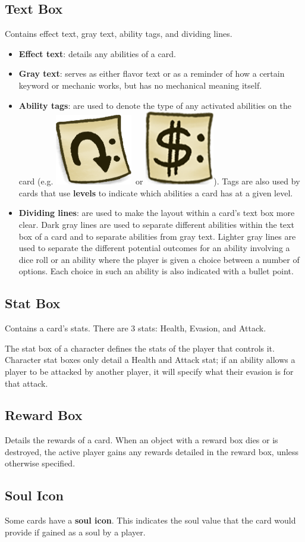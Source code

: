 \documentclass[a4paper, twoside]{report} %
\newcommand{\tap}{\includegraphics[scale=0.1]{./assets/Tag_Tap.png}}
\newcommand{\pay}{\includegraphics[scale=0.1]{./assets/Tag_Paid.png}}
\begin{document}
    \subsection*{Text Box} Contains effect text, gray text, ability tags, and dividing lines.
    \begin{itemize}
        \item \textbf{Effect text}: details any abilities of a card.
        \item \textbf{Gray text}: serves as either flavor text or as a reminder of how a certain keyword or mechanic works, but has no mechanical meaning itself.
        \item \textbf{Ability tags}: are used to denote the type of any activated abilities on the card (e.g. \tap\ or \pay). Tags are also used by cards that use \textbf{levels} to indicate which abilities a card has at a given level.
        \item \textbf{Dividing lines}: are used to make the layout within a card’s text box more clear. Dark gray lines are used to separate different abilities within the text box of a card and to separate abilities from gray text. Lighter gray lines are used to separate the different potential outcomes for an ability involving a dice roll or an ability where the player is given a choice between a number of options. Each choice in such an ability is also indicated with a bullet point.
    \end{itemize}
    \subsection*{Stat Box}
    Contains a card’s stats. There are 3 stats: Health, Evasion, and Attack.

    The stat box of a character defines the stats of the player that controls it. Character stat boxes only detail a Health and Attack stat; if an ability allows a player to be attacked by another player, it will specify what their evasion is for that attack.
    \subsection*{Reward Box}
    Details the rewards of a card. When an object with a reward box dies or is destroyed, the active player gains any rewards detailed in the reward box, unless otherwise specified.
    \subsection*{Soul Icon}
    Some cards have a \textbf{soul icon}. This indicates the soul value that the card would provide if gained as a soul by a player.
\end{document}
